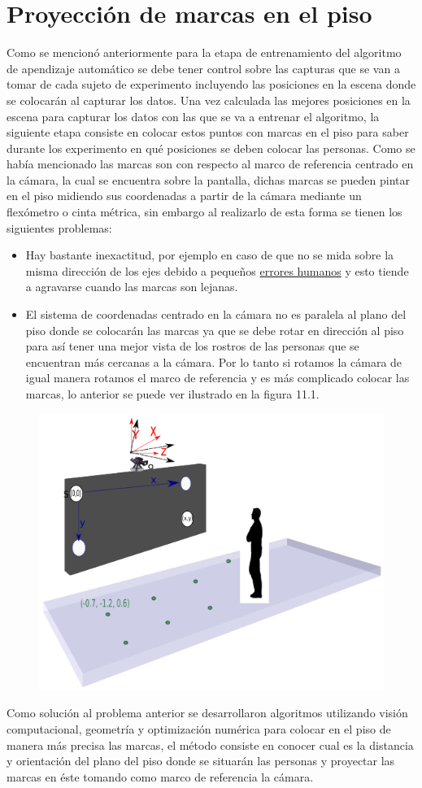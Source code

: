           \section{Proyección de marcas en el piso}
          Como se mencionó anteriormente para la etapa de entrenamiento del algoritmo de apendizaje automático se debe tener control sobre las capturas que se van a tomar de cada sujeto de experimento incluyendo las posiciones en la escena donde se colocarán al capturar los datos.
          Una vez calculada las mejores posiciones en la escena para capturar los datos con las que se va a entrenar el algoritmo, la siguiente etapa consiste en colocar estos puntos con marcas en el piso para saber durante los experimento en qué posiciones se deben colocar las personas.
          Como se había mencionado las marcas son con respecto al marco de referencia centrado en la cámara, la cual se encuentra sobre la pantalla, dichas marcas se pueden pintar en el piso midiendo sus coordenadas a partir de la cámara mediante un flexómetro o cinta métrica, sin embargo al realizarlo de esta forma se tienen los siguientes problemas:
          \begin{itemize}
          	\item Hay bastante inexactitud, por ejemplo en caso de que no se mida sobre la misma dirección de los ejes debido a pequeños \underline{errores humanos} y esto tiende a agravarse cuando las marcas son lejanas.
          	\item El sistema de coordenadas centrado en la cámara no es paralela al plano del piso donde se colocarán las marcas ya que se debe rotar en dirección al piso para así tener una mejor vista de los rostros de las personas que se encuentran más cercanas a la cámara. Por lo tanto si rotamos la cámara de igual manera rotamos el marco de referencia y es más complicado colocar las marcas, lo anterior se puede ver ilustrado en la figura 11.1. 
          \end{itemize}
          \begin{figure}[htbp]
          	\centering
          	\includegraphics[width=.6\textwidth]{./pictures/ejesRot2}
          	\caption{}\label{fig: figura}
          \end{figure}
          Como solución al problema anterior se desarrollaron algoritmos utilizando visión computacional, geometría y optimización numérica para colocar en el piso de manera más precisa las marcas, el método consiste en conocer cual es la distancia y orientación del plano del piso donde se situarán las personas y  proyectar las marcas en éste tomando como marco de referencia la cámara.
